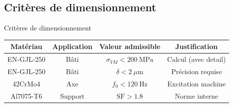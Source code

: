 \subsection{Critères de dimensionnement}
\label{sec:Critères de dimensionnement}

\begin{frame}[c]{Critères de dimensionnement}
    \centering
    \begin{tabular}{cccc}
      \toprule
      Matériau & Application & Valeur admissible & Justification \\
      \midrule
      EN-GJL-250 & Bâti & $\sigma_{VM} < 200~\text{MPa}$ & Calcul (avec detail) \\
      \midrule
      EN-GJL-250 & Bâti & $\delta < 2~\mu \text{m}$ & Précision requise \\
      \midrule
      42CrMo4 & Axe & $f_0 < 120~\text{Hz}$ & Excitation machine \\
      \midrule
      Al7075-T6 & Support & $\text{SF} > 1.8$ & Norme interne \\
      \bottomrule
    \end{tabular}
\end{frame}